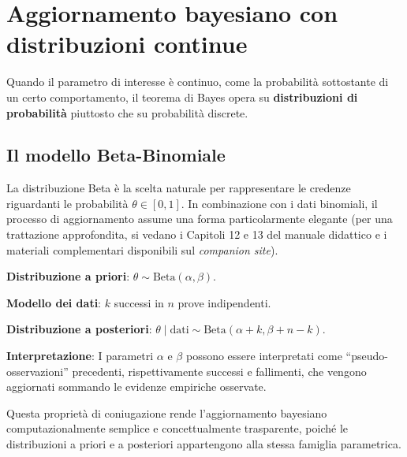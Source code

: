 \documentclass[
  letterpaper,
  DIV=11,
  numbers=noendperiod,
  oneside]{scrreprt}
\theoremstyle{definition}
\theoremstyle{plain}
\theoremstyle{definition}
\theoremstyle{remark}
\begin{document}
\section{Aggiornamento bayesiano con distribuzioni
continue}\label{aggiornamento-bayesiano-con-distribuzioni-continue}

Quando il parametro di interesse è continuo, come la probabilità
sottostante di un certo comportamento, il teorema di Bayes opera su
\textbf{distribuzioni di probabilità} piuttosto che su probabilità
discrete.

\subsection{Il modello Beta-Binomiale}\label{il-modello-beta-binomiale}

La distribuzione Beta è la scelta naturale per rappresentare le credenze
riguardanti le probabilità \(\theta \in [0,1]\). In combinazione con i
dati binomiali, il processo di aggiornamento assume una forma
particolarmente elegante (per una trattazione approfondita, si vedano i
Capitoli 12 e 13 del manuale didattico e i materiali complementari
disponibili sul \emph{companion site}).

\begin{tcolorbox}[enhanced jigsaw, arc=.35mm, breakable, colbacktitle=quarto-callout-note-color!10!white, opacityback=0, toprule=.15mm, rightrule=.15mm, colback=white, opacitybacktitle=0.6, leftrule=.75mm, coltitle=black, bottomtitle=1mm, left=2mm, toptitle=1mm, title=\textcolor{quarto-callout-note-color}{\faInfo}\hspace{0.5em}{Proprietà di coniugazione Beta-Binomiale}, titlerule=0mm, bottomrule=.15mm, colframe=quarto-callout-note-color-frame]

\textbf{Distribuzione a priori}:
\(\theta \sim \text{Beta}(\alpha, \beta)\).

\textbf{Modello dei dati}: \(k\) successi in \(n\) prove indipendenti.

\textbf{Distribuzione a posteriori}:
\(\theta \mid \text{dati} \sim \text{Beta}(\alpha + k, \beta + n - k)\).

\textbf{Interpretazione}: I parametri \(\alpha\) e \(\beta\) possono
essere interpretati come ``pseudo-osservazioni'' precedenti,
rispettivamente successi e fallimenti, che vengono aggiornati sommando
le evidenze empiriche osservate.

\end{tcolorbox}

Questa proprietà di coniugazione rende l'aggiornamento bayesiano
computazionalmente semplice e concettualmente trasparente, poiché le
distribuzioni a priori e a posteriori appartengono alla stessa famiglia
parametrica.
\end{document}
